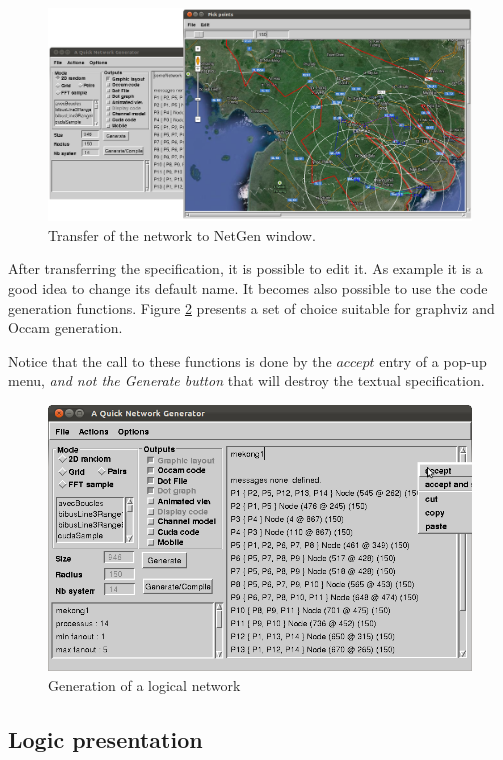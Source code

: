 \documentclass[times]{book}
\begin{document}
\begin{figure}[hbtp]
\begin{center} 
\includegraphics[width=12cm]{BuildNet1.png}
\caption{Transfer of the network to NetGen window.
}
\label{fig:BuildNet1}
\end{center}
\end{figure}

After transferring the specification, it is possible to edit it.
As example it is a good idea to change its default name.
It becomes also possible to use the code generation functions.
Figure 
\ref{fig:BuildNet2} presents a set of choice suitable for graphviz 
and Occam generation.

Notice that the call to these functions is done by the $accept$ entry
of a pop-up menu, {\sl and not the Generate button} that will destroy
the textual specification.
\begin{figure}[hbtp]
\begin{center} 
\includegraphics[width=12cm]{BuildNet2.png}
\caption{Generation of a logical network
}
\label{fig:BuildNet2}
\end{center}
\end{figure}


\subsection{Logic presentation}
\end{document}
